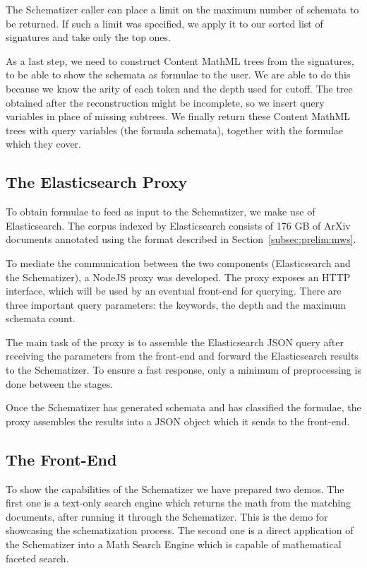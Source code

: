 \documentclass[a4paper,oneside]{article}
\def\cmml{\textsf{Content MathML}\xspace}
\def\arxiv{\textsf{ArXiv}\xspace}
\begin{document}
The Schematizer caller can place a limit on the maximum number of schemata to
be returned. If such a limit was specified, we apply it to our sorted list of
signatures and take only the top ones.

As a last step, we need to construct \cmml trees from the signatures,
to be able to show the schemata as formulae to the user. We are able to do
this because we know the arity of each token and the depth used for cutoff.
The tree obtained after the reconstruction might be incomplete, so we insert
query variables in place of missing subtrees.
We finally return these \cmml trees with query variables (the formula
schemata), together with the formulae which they cover.

\subsection{The Elasticsearch Proxy}\label{subsec:esproxy}
To obtain formulae to feed as input to the Schematizer, we make use of
Elasticsearch. The corpus indexed by Elasticsearch consists of 176 GB of \arxiv
documents annotated using the format described in
Section~\ref{subsec:prelim:mws}.

To mediate the communication between the two components (Elasticsearch and the
Schematizer), a NodeJS proxy was developed. The proxy exposes an HTTP
interface, which will be used by an eventual front-end for querying.
There are three important query parameters: the keywords, the depth and the
maximum schemata count.

The main task of the proxy is to assemble the Elasticsearch JSON query after
receiving the parameters from the front-end and forward the Elasticsearch
results to the Schematizer. To ensure a fast response, only a minimum of
preprocessing is done between the stages.

Once the Schematizer has generated schemata and has classified the formulae,
the proxy assembles the results into a JSON object which it sends to the
front-end.

\subsection{The Front-End}\label{subsec:frontend_schema}
To show the capabilities of the Schematizer we have prepared two demos.
The first one is a text-only search engine which returns the math from the
matching documents, after running it through the Schematizer. This is the demo
for showcasing the schematization process. The second one is a direct
application of the Schematizer into a Math Search Engine which is capable of
mathematical faceted search.
\end{document}
